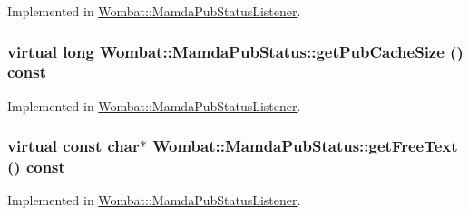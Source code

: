 Implemented in \hyperlink{classWombat_1_1MamdaPubStatusListener_cb0a6dff2e7c85b4c299444c743f7b36}{Wombat::Mamda\-Pub\-Status\-Listener}.\hypertarget{classWombat_1_1MamdaPubStatus_7edfe04c5f0e4e7b5deba2f68ae47f2e}{
\subsubsection[getPubCacheSize]{\setlength{\rightskip}{0pt plus 5cm}virtual long Wombat::Mamda\-Pub\-Status::get\-Pub\-Cache\-Size () const}}
\label{classWombat_1_1MamdaPubStatus_7edfe04c5f0e4e7b5deba2f68ae47f2e}




Implemented in \hyperlink{classWombat_1_1MamdaPubStatusListener_1ba02d9db2e8b657ec61b6de7d489e07}{Wombat::Mamda\-Pub\-Status\-Listener}.\hypertarget{classWombat_1_1MamdaPubStatus_b64900c7cdfbf708a639036dc0251165}{
\subsubsection[getFreeText]{\setlength{\rightskip}{0pt plus 5cm}virtual const char$\ast$ Wombat::Mamda\-Pub\-Status::get\-Free\-Text () const}}
\label{classWombat_1_1MamdaPubStatus_b64900c7cdfbf708a639036dc0251165}




Implemented in \hyperlink{classWombat_1_1MamdaPubStatusListener_ac4c3ecbefe9170ecaa873e725cac4f3}{Wombat::Mamda\-Pub\-Status\-Listener}.